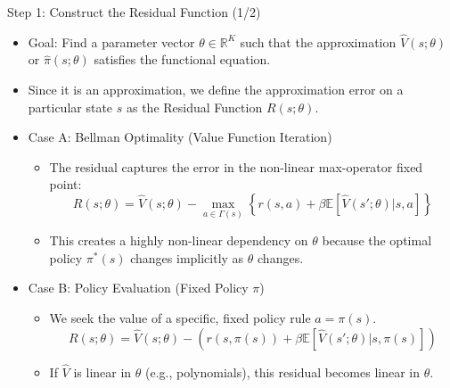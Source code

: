 \documentclass[aspectratio=169]{beamer}
\newcommand{\1}{\mathbf{1}}
\begin{document}
\begin{frame}{Step 1: Construct the Residual Function (1/2)}
    \small
        \begin{itemize}
            \item Goal: Find a parameter vector $\theta \in \mathbb{R}^K$ such that the approximation $\hat{V}(s; \theta)$ or $\hat{\pi}(s; \theta)$ satisfies the functional equation. 
            \item Since it is an approximation, we define the approximation error on a particular state $s$ as the Residual Function $R(s; \theta)$.
            
            \item Case A: Bellman Optimality (Value Function Iteration)
            \begin{itemize}
                \item The residual captures the error in the non-linear max-operator fixed point:
                $$ R(s; \theta) = \hat{V}(s; \theta) - \max_{a \in \Gamma(s)} \left\{ r(s,a) + \beta \mathbb{E}[\hat{V}(s'; \theta) | s, a] \right\} $$
                \item This creates a highly non-linear dependency on $\theta$ because the optimal policy $\pi^*(s)$ changes implicitly as $\theta$ changes.
            \end{itemize}
            
            \item Case B: Policy Evaluation (Fixed Policy $\pi$)
            \begin{itemize}
                \item We seek the value of a specific, fixed policy rule $a = \pi(s)$.
                $$ R(s; \theta) = \hat{V}(s; \theta) - \left( r(s, \pi(s)) + \beta \mathbb{E}[\hat{V}(s'; \theta) | s, \pi(s)] \right) $$
                \item If $\hat{V}$ is linear in $\theta$ (e.g., polynomials), this residual becomes linear in $\theta$.
            \end{itemize}
        \end{itemize}
    \end{frame}
\end{document}
